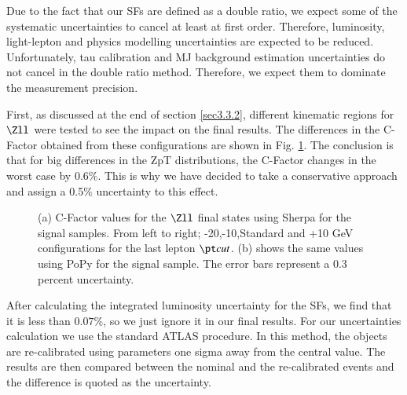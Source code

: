 Due to the fact that our SFs are defined as a double ratio, we expect some of the systematic uncertainties to cancel at least at first order. Therefore, luminosity, light-lepton and physics modelling uncertainties are expected to be reduced. Unfortunately, tau calibration and MJ background estimation uncertainties do not cancel in the double ratio method. Therefore, we expect them to dominate the measurement precision.

First, as discussed at the end of section \ref{sec3.3.2}, different kinematic regions for $\Zll$ were tested to see the impact on the final results. The differences in the C-Factor obtained from these configurations are shown in Fig. \ref{Fig15}. The conclusion is that for big differences in the ZpT distributions, the C-Factor changes in the worst case by 0.6$\%$. This is why we have decided to take a conservative approach and assign a 0.5$\%$ uncertainty to this effect.

\begin{figure}[htbp]
	\centering
	\caption{ (a) C-Factor values for the $\Zll$ final states using Sherpa for the signal samples. From left to right; -20,-10,Standard and +10 GeV configurations for the last lepton $\pt cut$. (b) shows the same values using PoPy for the signal sample. The error bars represent a 0.3 percent uncertainty. }
	\label{Fig15}
\end{figure}

After calculating the integrated luminosity uncertainty for the SFs, we find that it is less than $0.07\%$, so we just ignore it in our final results. For our uncertainties calculation we use the standard ATLAS procedure. In this method, the objects are re-calibrated using parameters one sigma away from the central value. The results are then compared between the nominal and the re-calibrated events and the difference is quoted as the uncertainty. 

